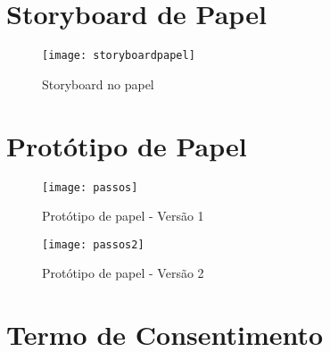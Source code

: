 \begin{apendicesenv}

\partapendices
\chapter{Storyboard de Papel}

\begin{figure}[!htb]
 \centering
 \texttt{[image: storyboardpapel]}
 \caption{Storyboard no papel}
 \label{Rotulo}

\end{figure}

\chapter{Protótipo de Papel}

\begin{figure}[!htb]
 \centering
 \texttt{[image: passos]}
 \caption{Protótipo de papel - Versão 1}
 \label{Rotulo}

\end{figure}

\begin{figure}[!htb]
 \centering
 \texttt{[image: passos2]}
 \caption{Protótipo de papel - Versão 2}
 \label{Rotulo}

\end{figure}

\chapter{Termo de Consentimento}

  

\end{apendicesenv}
